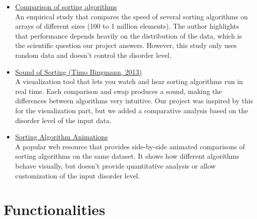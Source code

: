 \documentclass{article}
\begin{document}
\begin{itemize}
\item \href{http://warp.povusers.org/SortComparison/}{Comparison of sorting algorithms} \\
An empirical study that compares the speed of several sorting algorithms on arrays of different sizes (100 to 1 million elements). The author highlights that performance depends heavily on the distribution of the data, which is the scientific question our project answers. However, this study only uses random data and doesn't control the disorder level.

\item \href{https://www.youtube.com/watch?v=kPRA0W1kECg}{Sound of Sorting (Timo Bingmann, 2013)} \\
A visualization tool that lets you watch and hear sorting algorithms run in real time. Each comparison and swap produces a sound, making the differences between algorithms very intuitive. Our project was inspired by this for the visualization part, but we added a comparative analysis based on the disorder level of the input data.

\item \href{https://www.toptal.com/developers/sorting-algorithms}{Sorting Algorithm Animations} \\
A popular web resource that provides side-by-side animated comparisons of sorting algorithms on the same dataset. It shows how different algorithms behave visually, but doesn't provide quantitative analysis or allow customization of the input disorder level.
\end{itemize}

\section{Functionalities}
\end{document}
